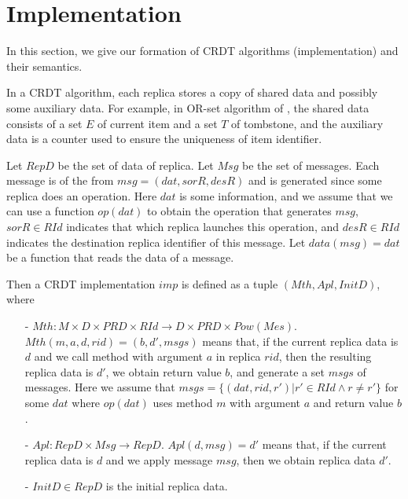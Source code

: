 
\section{Implementation}
\label{sec:implementation}

In this section, we give our formation of CRDT algorithms (implementation) and their semantics.

In a CRDT algorithm, each replica stores a copy of shared data and possibly some auxiliary data. For example, in OR-set algorithm of \cite{Bieniusa:2012}, the shared data consists of a set $E$ of current item and a set $T$ of tombstone, and the auxiliary data is a counter used to ensure the uniqueness of item identifier.

Let $RepD$ be the set of data of replica. Let $Msg$ be the set of messages. Each message is of the from $msg=(dat,sorR,desR)$ and is generated since some replica does an operation. Here $dat$ is some information, and we assume that we can use a function $op(dat)$ to obtain the operation that generates $msg$, $sorR \in RId$ indicates that which replica launches this operation, and $desR \in RId$ indicates the destination replica identifier of this message. Let $data(msg)=dat$ be a function that reads the data of a message. 

Then a CRDT implementation $imp$ is defined as a tuple $(Mth,Apl,InitD)$, where

\begin{itemize}
\setlength{\itemsep}{0.5pt}
\item[-] $Mth: M \times D \times PRD \times RId \rightarrow D \times PRD \times Pow(Mes)$. $Mth(m,a,d,rid) = (b,d',msgs)$ means that, if the current replica data is $d$ and we call method with argument $a$ in replica $rid$, then the resulting replica data is $d'$, we obtain return value $b$, and generate a set $msgs$ of messages. Here we assume that $msgs = \{ (dat,rid,r') \vert r' \in RId \wedge r \neq r' \}$ for some $dat$ where $op(dat)$ uses method $m$ with argument $a$ and return value $b$.

\item[-] $Apl: RepD \times Msg \rightarrow RepD$. $Apl(d,msg) = d'$ means that, if the current replica data is $d$ and we apply message $msg$, then we obtain replica data $d'$. 

\item[-] $InitD \in RepD$ is the initial replica data. 
\end{itemize}

